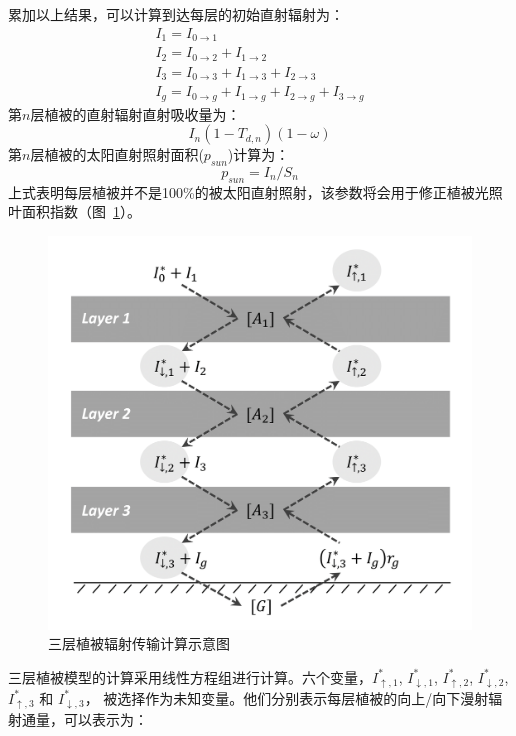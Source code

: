 累加以上结果，可以计算到达每层的初始直射辐射为：
\begin{equation}
\begin{array}{l}I_{1}=I_{0 \rightarrow 1} \\ I_{2}=I_{0 \rightarrow 2}+I_{1 \rightarrow 2} \\ 
    I_{3}=I_{0 \rightarrow 3}+I_{1 \rightarrow 3}+I_{2 \rightarrow 3} \\ 
    I_{g}=I_{0 \rightarrow g}+I_{1 \rightarrow g}+I_{2 \rightarrow g}+I_{3 \rightarrow g}\end{array}
\end{equation}
第$n$层植被的直射辐射直射吸收量为：
\begin{equation}
I_{n}\left(1-T_{d, n}\right)(1-\omega)
\end{equation}
第$n$层植被的太阳直射照射面积($p_{sun}$)计算为：
\begin{equation}
p_{sun}=I_{n} / S_{n}
\end{equation}
上式表明每层植被并不是100\%的被太阳直射照射，该参数将会用于修正植被光照叶面积指数（图~\ref{fig:三层植被辐射传输计算示意图}）。
{
\begin{figure}[]
\centering
\includegraphics[width=0.7\columnwidth]{Figures/辐射过程及辐射通量计算/三层植被辐射传输计算示意图.png}
\caption{三层植被辐射传输计算示意图}
\label{fig:三层植被辐射传输计算示意图}
\end{figure}
}
三层植被模型的计算采用线性方程组进行计算。六个变量，$I_{\uparrow,1}^\ast$, $I_{\downarrow,1}^\ast$, $I_{\uparrow,2}^\ast$, $I_{\downarrow,2}^\ast$, $I_{\uparrow,3}^\ast$ 和 $I_{\downarrow,3}^\ast$，
被选择作为未知变量。他们分别表示每层植被的向上/向下漫射辐射通量，可以表示为：
